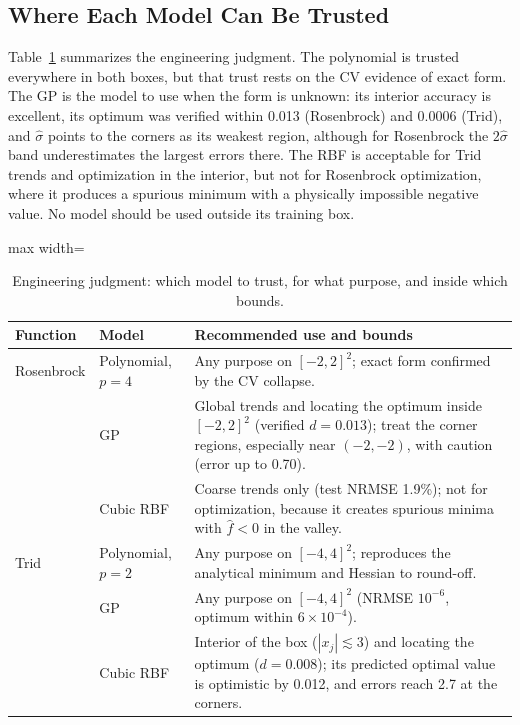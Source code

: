 \subsection{Where Each Model Can Be Trusted}

Table~\ref{tab:trust} summarizes the engineering judgment. The polynomial is trusted everywhere in both boxes, but that trust rests on the CV evidence of exact form. The GP is the model to use when the form is unknown: its interior accuracy is excellent, its optimum was verified within 0.013 (Rosenbrock) and 0.0006 (Trid), and $\hat\sigma$ points to the corners as its weakest region, although for Rosenbrock the $2\hat\sigma$ band underestimates the largest errors there. The RBF is acceptable for Trid trends and optimization in the interior, but not for Rosenbrock optimization, where it produces a spurious minimum with a physically impossible negative value. No model should be used outside its training box.

\begin{table}[!htbp]
  \centering
  \caption{Engineering judgment: which model to trust, for what purpose, and inside which bounds.}
  \label{tab:trust}
  \begin{adjustbox}{max width=\linewidth}
  \begin{tabular}{p{}p{}p{}}
    \toprule
    Function & Model & Recommended use and bounds \\
    \midrule
    Rosenbrock & Polynomial, $p=4$ & Any purpose on $[-2,2]^2$; exact form confirmed by the CV collapse. \\
     & GP & Global trends and locating the optimum inside $[-2,2]^2$ (verified $d=0.013$); treat the corner regions, especially near $(-2,-2)$, with caution (error up to 0.70). \\
     & Cubic RBF & Coarse trends only (test NRMSE 1.9\%); not for optimization, because it creates spurious minima with $\hat f<0$ in the valley. \\
    \midrule
    Trid & Polynomial, $p=2$ & Any purpose on $[-4,4]^2$; reproduces the analytical minimum and Hessian to round-off. \\
     & GP & Any purpose on $[-4,4]^2$ (NRMSE $10^{-6}$, optimum within $6\times10^{-4}$). \\
     & Cubic RBF & Interior of the box ($|x_j|\lesssim3$) and locating the optimum ($d=0.008$); its predicted optimal value is optimistic by 0.012, and errors reach 2.7 at the corners. \\
    \bottomrule
  \end{tabular}
  \end{adjustbox}
\end{table}

